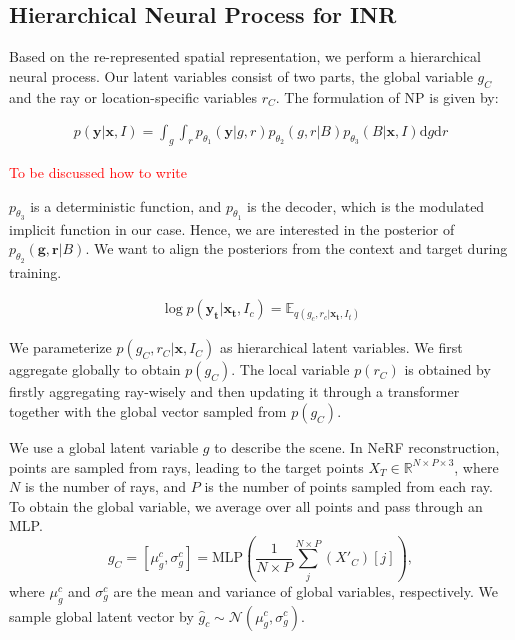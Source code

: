 \subsection{Hierarchical Neural Process for INR}


 Based on the re-represented spatial representation, we perform a hierarchical neural process. Our latent variables consist of two parts, the global variable $g_C$ and the ray or location-specific variables $r_C$. The formulation of NP is given by:

\begin{align}
    p(\mathbf{y}|\mathbf{x}, I) = \int_{g} \int_{r}  p_{\theta_1}(\mathbf{y}| g, r) p_{\theta_2}(g, r | B) p_{\theta_3}(B|\mathbf{x}, I) \mathrm{d}g  \mathrm{d}r 
\end{align}

\textcolor{red}{To be discussed how to write}

 $p_{\theta_3}$ is a deterministic function, and $p_{\theta_1}$ is the decoder, which is the modulated implicit function in our case. Hence, we are interested in the posterior of $p_{\theta_2}(\mathbf{g}, \mathbf{r} | B)$. We want to align the posteriors from the context and target during training. 

\begin{align}
    \log p(\mathbf{y_t}|\mathbf{x_t}, I_c) = \mathbb{E}_{q(g_c,r_c|\mathbf{x_t}, I_t)} 
\end{align}


We parameterize $p(g_C, r_C|\mathbf{x}, I_C)$ as hierarchical latent variables. We first aggregate globally to obtain $p(g_C)$. The local variable $p(r_C)$ is obtained by firstly aggregating ray-wisely and then updating it through a transformer together with the global vector sampled from $p(g_C)$. 



 We use a global latent variable $g$ to describe the scene. In NeRF reconstruction, points are sampled from rays, leading to the target points $X_T\in \mathbb{R}^{N\times P\times 3}$, where $N$ is the number of rays, and $P$ is the number of points sampled from each ray. To obtain the global variable, we average over all points and pass through an MLP. 
\begin{equation}
    g_C = [\mu^c_g, \sigma^c_g] = \text{MLP}(\frac{1}{N\times P}\sum_j^{N\times P}(X'_C)[j]),
\end{equation}
where $\mu^c_g$ and $\sigma^c_g$ are the mean and variance of global variables, respectively. We sample global latent vector by $\hat{g}_c \sim \mathcal{N}(\mu^c_g, \sigma^c_g)$. 



